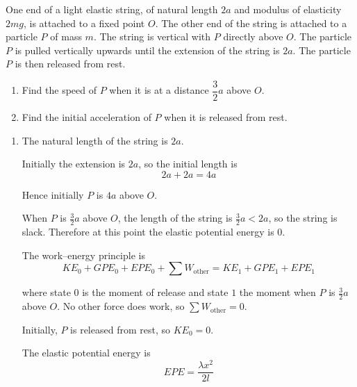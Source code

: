 \documentclass[leqno]{article}
\begin{document}
\djsFrontMatter
\begin{enumerate}[
  label=\textbf{\arabic*.},
  leftmargin=*,
  topsep=0pt,
  partopsep=0pt,
  parsep=0pt
]

\questionitem

One end of a light elastic string, of natural length $2a$ and modulus of elasticity $2mg$, is attached to a fixed point $O$. The other end of the string is attached to a particle $P$ of mass $m$. The string is vertical with $P$ directly above $O$. The particle $P$ is pulled vertically upwards until the extension of the string is $2a$. The particle $P$ is then released from rest. \\
\begin{enumerate}[label=\textbf{(\alph*)}]
  \item Find the speed of $P$ when it is at a distance $\dfrac{3}{2}a$ above $O$.  \\
  \item Find the initial acceleration of $P$ when it is released from rest.  \\
\end{enumerate}

\vspace*{10pt}

\begin{djsSolution}
\begin{enumerate}[label=\textbf{(\alph*)}, start=1]
  \item The natural length of the string is $2a$.

Initially the extension is $2a$, so the initial length is
\[
2a+2a=4a
\]

Hence initially $P$ is $4a$ above $O$.

When $P$ is $\frac{3}{2}a$ above $O$, the length of the string is $\frac{3}{2}a<2a$, so the string is slack. Therefore at this point the elastic potential energy is $0$.

The work--energy principle is
\[
KE_0+GPE_0+EPE_0+\sum W_{\text{other}}=KE_1+GPE_1+EPE_1
\]

where state \(0\) is the moment of release and state \(1\) the moment when \(P\) is \(\frac{3}{2}a\) above \(O\). No other force does work, so \(\sum W_{\text{other}}=0\).

Initially, $P$ is released from rest, so $KE_0=0$.

The elastic potential energy is
\[
EPE=\frac{\lambda x^2}{2l}
\]


\end{enumerate}
\end{djsSolution}
\end{enumerate}
\end{document}
